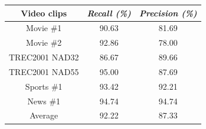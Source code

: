 \begin{tabular*}{\mircolumntablewidth}{@{\extracolsep{\fill}}ccc@{}}
    \toprule
    Video clips & \textit{Recall (\%)} & \textit{Precision (\%)}\\
    \midrule
    Movie \#1 & 90.63 & 81.69\\
    Movie \#2 & 92.86 & 78.00\\
    TREC2001 NAD32 & 86.67 & 89.66\\
    TREC2001 NAD55 & 95.00 & 87.69\\
    Sports \#1 & 93.42 & 92.21\\
    News \#1 & 94.74 & 94.74\\
    Average & 92.22 & 87.33\\
    \bottomrule
\end{tabular*}
